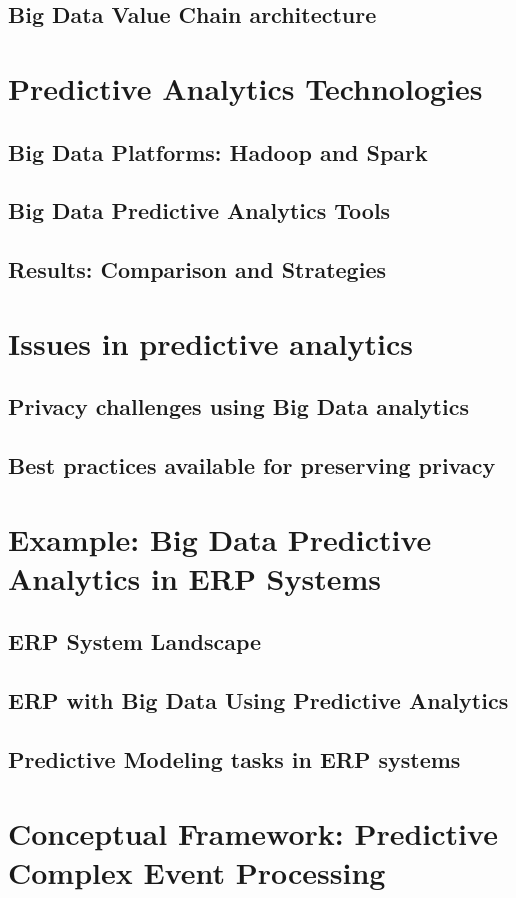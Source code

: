 \documentclass[runningheads]{llncs}
\begin{document}
\subsection{Big Data Value Chain architecture}


\section{Predictive Analytics Technologies}
\subsection{Big Data Platforms: Hadoop and Spark}
\subsection{Big Data Predictive Analytics Tools}
\subsection{Results: Comparison and Strategies}
\section{Issues in predictive analytics}
\subsection{Privacy challenges using Big Data analytics}
\subsection{Best practices available for preserving privacy}
\section{Example: Big Data Predictive Analytics in ERP Systems}
\subsection{ERP System Landscape}
\subsection{ERP with Big Data Using Predictive Analytics}
\subsection{Predictive Modeling tasks in ERP systems}
\section{Conceptual Framework: Predictive Complex Event Processing}
\end{document}
